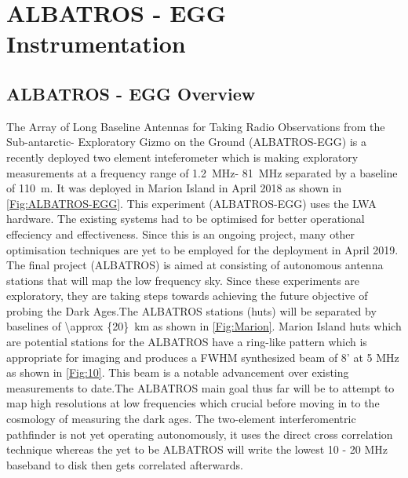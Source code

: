 \documentclass[12pt,a4paper]{report}
\begin{document}
\chapter{ALBATROS - EGG Instrumentation}
\section{ALBATROS - EGG Overview}
		
The Array of Long Baseline Antennas for Taking Radio Observations from the Sub-antarctic- Exploratory Gizmo on the Ground (ALBATROS-EGG) is a recently deployed two element inteferometer which is making exploratory measurements at a frequency range of \SI{1.2}{MHz}- \SI{81}{MHz} separated by a baseline of \SI{110}{m}. It was deployed in Marion Island in April 2018 as shown in \autoref{Fig:ALBATROS-EGG}. This experiment (ALBATROS-EGG) uses the LWA hardware.  The existing systems had to be optimised for better operational effeciency and effectiveness. Since this is an ongoing project, many other optimisation techniques are yet to be employed for the deployment in April 2019. \\

The final project (ALBATROS) is aimed at consisting of autonomous antenna stations that will map the low frequency sky. Since these experiments are exploratory, they are taking steps towards achieving the future objective of probing the Dark Ages.The ALBATROS stations (huts) will be separated by baselines of \SI{\approx {20}}{km} as shown in \autoref{Fig:Marion}. Marion Island huts which are potential stations for the ALBATROS have a ring-like pattern which is appropriate for imaging and produces a FWHM synthesized beam of 8' at 5 MHz as shown in \autoref{Fig:10}. This beam is a notable advancement over existing measurements to date.The ALBATROS main goal thus far will be to attempt to map high resolutions at low frequencies which crucial before moving in to the cosmology of measuring the dark ages. The two-element interferomentric pathfinder is not yet operating autonomously, it uses the direct cross correlation technique whereas the yet to be ALBATROS will write the lowest 10 - 20 MHz baseband to disk then gets correlated afterwards.\\
\end{document}
